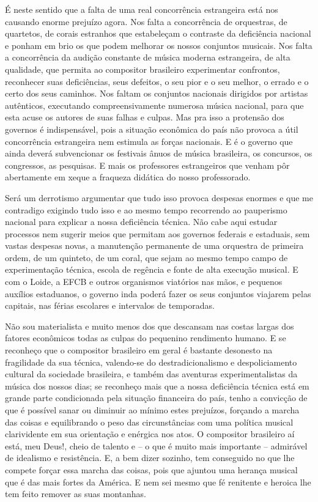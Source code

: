 É neste sentido que a falta de uma real concorrência estrangeira está
nos causando enorme prejuízo agora. Nos falta a concorrência de
orquestras, de quartetos, de corais estranhos que estabeleçam o
contraste da deficiência nacional e ponham em brio os que podem melhorar
os nossos conjuntos musicais. Nos falta a concorrência da audição
constante de música moderna estrangeira, de alta qualidade, que permita
ao compositor brasileiro experimentar confrontos, reconhecer suas
deficiências, seus defeitos, o seu pior e o seu melhor, o errado e o
certo dos seus caminhos. Nos faltam os conjuntos nacionais dirigidos por
artistas autênticos, executando compreensivamente numerosa música
nacional, para que esta acuse os autores de suas falhas e culpas. Mas
pra isso a protensão dos governos é indispensável, pois a situação
econômica do país não provoca a útil concorrência estrangeira nem
estimula as forças nacionais. E é o governo que ainda deverá
subvencionar os festivais ânuos de música brasileira, os concursos, os
congressos, as pesquisas. E mais os professores estrangeiros que venham
pôr abertamente em xeque a fraqueza didática do nosso professorado.

Será um derrotismo argumentar que tudo isso provoca despesas enormes e
que me contradigo exigindo tudo isso e ao mesmo tempo recorrendo ao
pauperismo nacional para explicar a nossa deficiência técnica. Não cabe
aqui estudar processos nem sugerir meios que permitam aos governos
federais e estaduais, sem vastas despesas novas, a manutenção permanente
de uma orquestra de primeira ordem, de um quinteto, de um coral, que
sejam ao mesmo tempo campo de experimentação técnica, escola de regência
e fonte de alta execução musical. E com o Loide, a EFCB e outros
organismos viatórios nas mãos, e pequenos auxílios estaduanos, o governo
inda poderá fazer os seus conjuntos viajarem pelas capitais, nas férias
escolares e intervalos de temporadas.

Não sou materialista e muito menos dos que descansam nas costas largas
dos fatores econômicos todas as culpas do pequenino rendimento humano. E
se reconheço que o compositor brasileiro em geral é bastante desonesto
na fragilidade da sua técnica, valendo-se do destradicionalismo e
despoliciamento cultural da sociedade brasileira, e também das aventuras
experimentalistas da música dos nossos dias; se reconheço mais que a
nossa deficiência técnica está em grande parte condicionada pela
situação financeira do país, tenho a convicção de que é possível sanar
ou diminuir ao mínimo estes prejuízos, forçando a marcha das coisas e
equilibrando o peso das circunstâncias com uma política musical
clarividente em sua orientação e enérgica nos atos. O compositor
brasileiro aí está, meu Deus!, cheio de talento e -- o que é muito mais
importante -- admirável de idealismo e resistência. E, a bem dizer
sozinho, tem conseguido no que lhe compete forçar essa marcha das
coisas, pois que ajuntou uma herança musical que é das mais fortes da
América. E nem sei mesmo que fé renitente e heroica lhe tem feito
remover as suas montanhas.



